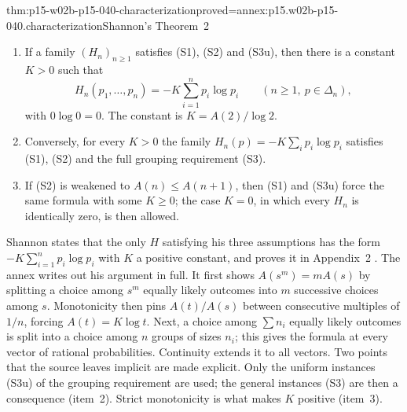 \begin{hbtheorem}{thm:p15-w02b-p15-040-characterization}{proved=annex:p15.w02b-p15-040.characterization}{Shannon's Theorem~2}
\begin{enumerate}
\item If a family \((H_n)_{n\geq1}\) satisfies (S1), (S2) and (S3u),
then there is a constant \(K>0\) such that
\[
 H_n(p_1,\ldots,p_n)=-K\sum_{i=1}^np_i\log p_i
 \qquad(n\geq1,\ p\in\Delta_n),
\]
with \(0\log0=0\). The constant is \(K=A(2)/\log2\).
\item Conversely, for every \(K>0\) the family
\(H_n(p)=-K\sum_ip_i\log p_i\) satisfies (S1), (S2) and the full
grouping requirement (S3).
\item If (S2) is weakened to \(A(n)\leq A(n+1)\), then (S1) and (S3u)
force the same formula with some \(K\geq0\); the case \(K=0\), in
which every \(H_n\) is identically zero, is then allowed.
\end{enumerate}
\end{hbtheorem}

Shannon states that the only \(H\) satisfying his three assumptions has
the form \(-K\sum_{i=1}^np_i\log p_i\) with \(K\) a positive constant,
and proves it in Appendix~2 \cite[pp.~11, 28--29]{Shannon1948MathematicalTheory}.
The annex writes out his argument in full. It first shows
\(A(s^m)=mA(s)\) by splitting a choice among \(s^m\) equally likely
outcomes into \(m\) successive choices among \(s\). Monotonicity then
pins \(A(t)/A(s)\) between consecutive multiples of \(1/n\), forcing
\(A(t)=K\log t\). Next, a choice among \(\sum n_i\) equally likely
outcomes is split into a choice among \(n\) groups of sizes \(n_i\);
this gives the formula at every vector of rational probabilities.
Continuity extends it to all vectors. Two points that the source leaves
implicit are made explicit. Only the uniform instances (S3u) of the
grouping requirement are used; the general instances (S3) are then a
consequence (item~2). Strict monotonicity is what makes \(K\) positive
(item~3).

